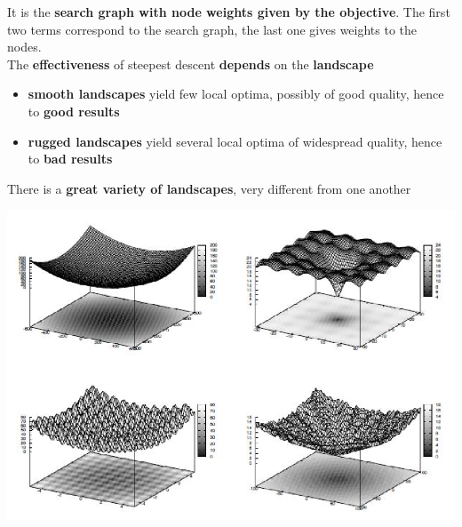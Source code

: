 It is the \textbf{search graph with node weights given by the objective}. The first two terms correspond to the search graph, the last one gives weights to the nodes.\\

The \textbf{effectiveness} of steepest descent \textbf{depends} on the \textbf{landscape}
\begin{itemize}
	\item \textbf{smooth landscapes} yield few local optima, possibly of good quality, hence to \textbf{good results}
	
	\item \textbf{rugged landscapes} yield several local optima of widespread quality, hence to \textbf{bad results}
\end{itemize}

There is a \textbf{great variety of landscapes}, very different from one another
\begin{center}
	\includegraphics[width=0.9\columnwidth]{img/landscape1}
\end{center}

\newpage

